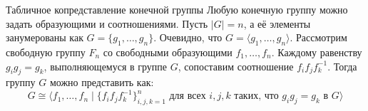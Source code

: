 \begin{Remark}{Табличное копредставление конечной группы}{}
	Любую конечную группу можно задать образующими и соотношениями.
	Пусть $|G| = n$, а её элементы занумерованы как $G = \{g_1, \dots, g_n\}$. Очевидно, что $G = \langle g_1, \dots, g_n \rangle$.
	Рассмотрим свободную группу $F_n$ со свободными образующими $f_1, \dots, f_n$. Каждому равенству $g_i g_j = g_k$, выполняющемуся в группе $G$, сопоставим соотношение $f_i f_j f_k^{-1}$.
	Тогда группу $G$ можно представить как:
	\[ G \cong \langle f_1, \dots, f_n \mid \{ f_i f_j f_k^{-1} \}_{i,j,k=1}^n \text{ для всех } i,j,k \text{ таких, что } g_i g_j = g_k \text{ в } G \rangle \]
\end{Remark}